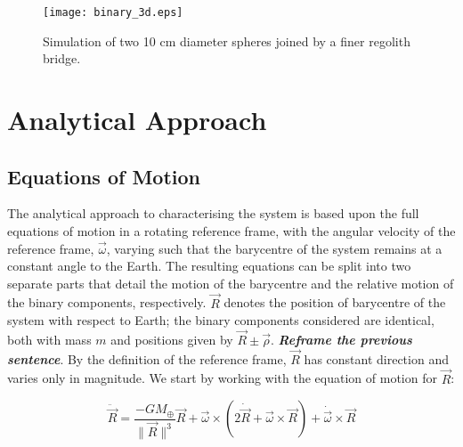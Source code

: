 \documentclass[letterpaper, preprint, paper,11pt]{AAS}	%
\begin{document}
\begin{figure}[H]
\centering
\texttt{[image: binary\_3d.eps]} 
\caption{Simulation of two 10 cm diameter spheres joined by a finer regolith bridge.} 
\label{fig:Pic}
\end{figure} 

\section{Analytical Approach}
\subsection{Equations of Motion}

The analytical approach to characterising the system is based upon the full equations of motion in a rotating reference frame, with the angular velocity of the reference frame, $\vec{\omega}$, varying such that the barycentre of the system remains at a constant angle to the Earth. The resulting equations can be split into two separate parts that detail the motion of the barycentre and the relative motion of the binary components, respectively. $\vec{R}$ denotes the position of barycentre of the system with respect to Earth; the binary components considered are identical, both with mass $m$ and positions given by $\vec{R}\pm\vec{\rho}$. \textbf{\emph{Reframe the previous sentence}}. By the definition of the reference frame, $\vec{R}$ has constant direction and varies only in magnitude. We start by working with the equation of motion for $\vec{R}$:

\begin{equation}
\ddot{\vec{R}} = \frac{-GM_\oplus}{\|\vec{R}\|^{3}}\vec{R}+\vec{\omega}\times(2\dot{\vec{R}}+\vec{\omega}\times\vec{R})+\dot{\vec{\omega}}\times\vec{R}
\end{equation}
\end{document}

